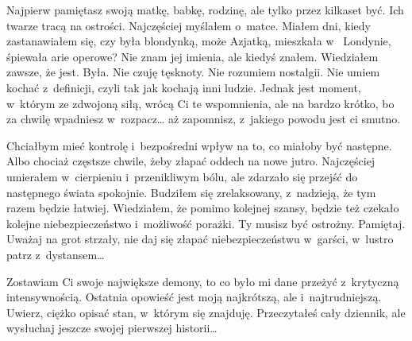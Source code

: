 Najpierw pamiętasz swoją matkę, babkę, rodzinę, ale tylko przez kilkaset być. Ich twarze tracą na ostrości. 
Najczęściej myślałem o~matce. Miałem dni, kiedy zastanawiałem się, czy była blondynką, może Azjatką, mieszkała w~
Londynie, śpiewała arie operowe? Nie znam jej imienia, ale kiedyś znałem. Wiedziałem zawsze, że jest. Była. Nie czuję 
tęsknoty. Nie rozumiem nostalgii. Nie umiem kochać z~definicji, czyli tak jak kochają inni ludzie. Jednak jest 
moment, w~którym ze zdwojoną siłą, wrócą Ci te wspomnienia, ale na bardzo krótko, bo za chwilę wpadniesz w~rozpacz… 
aż zapomnisz, z~jakiego powodu jest ci smutno.

Chciałbym mieć kontrolę i~bezpośredni wpływ na to, co miałoby być następne. Albo chociaż częstsze chwile, żeby złapać 
oddech na nowe jutro. Najczęściej umierałem w~cierpieniu i~przenikliwym bólu, ale zdarzało się przejść do następnego 
świata spokojnie. Budziłem się zrelaksowany, z~nadzieją, że tym razem będzie łatwiej. Wiedziałem, że pomimo kolejnej 
szansy, będzie też czekało kolejne niebezpieczeństwo i~możliwość porażki. Ty musisz być ostrożny. Pamiętaj. Uważaj na 
grot strzały, nie daj się złapać niebezpieczeństwu w~garści, w~lustro patrz z~dystansem…

Zostawiam Ci swoje największe demony, to co było mi dane przeżyć z~krytyczną intensywnością. Ostatnia opowieść jest 
moją najkrótszą, ale i~najtrudniejszą. Uwierz, ciężko opisać stan, w~którym się znajduję. Przeczytałeś cały dziennik, 
ale wysłuchaj jeszcze swojej pierwszej historii…

\paraSep

